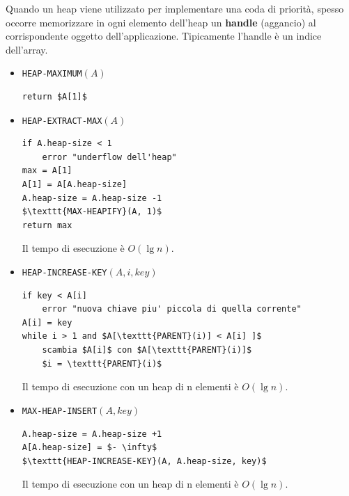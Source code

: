 \documentclass[11pt,a4paper]{article}
\begin{document}
Quando un heap viene utilizzato per implementare una coda di priorità, spesso occorre memorizzare in ogni
elemento dell’heap un \textbf{handle} (aggancio) al corrispondente oggetto dell’applicazione. Tipicamente l’handle è un indice dell’array.
\begin{itemize}[leftmargin=*]
  \item
\texttt{HEAP-MAXIMUM}$(A)$
\begin{lstlisting}[mathescape=true]
return $A[1]$
\end{lstlisting}

  \item
  \texttt{HEAP-EXTRACT-MAX}$(A)$
\begin{lstlisting}[mathescape=true]
if A.heap-size < 1
    error "underflow dell'heap"
max = A[1]
A[1] = A[A.heap-size]
A.heap-size = A.heap-size -1
$\texttt{MAX-HEAPIFY}(A, 1)$
return max
\end{lstlisting}
Il tempo di esecuzione è $O(\lg n)$.

  \item
\texttt{HEAP-INCREASE-KEY}$(A, i, key)$
\begin{lstlisting}[mathescape=true]
if key < A[i]
    error "nuova chiave piu' piccola di quella corrente"
A[i] = key
while i > 1 and $A[\texttt{PARENT}(i)] < A[i] ]$
    scambia $A[i]$ con $A[\texttt{PARENT}(i)]$
    $i = \texttt{PARENT}(i)$
\end{lstlisting}
Il tempo di esecuzione con un heap di
n elementi è $O(\lg n)$.

  \item
\texttt{MAX-HEAP-INSERT}$(A, key)$
\begin{lstlisting}[mathescape=true]
A.heap-size = A.heap-size +1
A[A.heap-size] = $- \infty$
$\texttt{HEAP-INCREASE-KEY}(A, A.heap-size, key)$
\end{lstlisting}
Il tempo di esecuzione con un heap di
n elementi è $O(\lg n)$.
\end{itemize}
\end{document}

